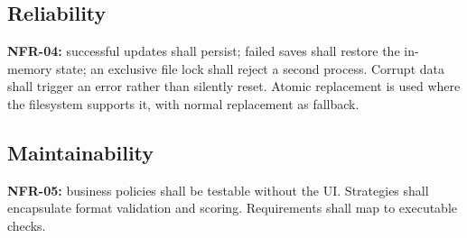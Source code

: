 \subsection{Reliability}
\textbf{NFR-04:} successful updates shall persist; failed saves shall restore the in-memory state; an exclusive file lock shall reject a second process. Corrupt data shall trigger an error rather than silently reset. Atomic replacement is used where the filesystem supports it, with normal replacement as fallback.
\subsection{Maintainability}
\textbf{NFR-05:} business policies shall be testable without the UI. Strategies shall encapsulate format validation and scoring. Requirements shall map to executable checks.

